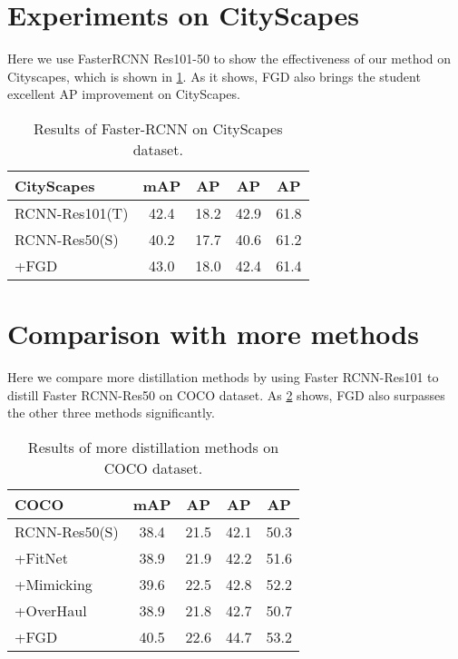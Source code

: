 \documentclass[10pt,twocolumn,letterpaper]{article}
\begin{document}
\section{Experiments on CityScapes}
Here we use FasterRCNN Res101-50 to show the effectiveness of our method on Cityscapes\cite{cordts2016cityscapes}, which is shown in \cref{table:city results}. As it shows, FGD also brings the student excellent AP improvement on CityScapes.
\begin{table}
  \centering
  \begin{tabular}{l|cccc}
    \toprule
    {\bf CityScapes} & mAP & AP & AP & AP\\
    \midrule
    RCNN-Res101(T) & 42.4 &18.2&42.9&61.8\\
    RCNN-Res50(S) & 40.2 &17.7&40.6&61.2\\
    +FGD & 43.0&18.0&42.4&61.4 \\
    \bottomrule
  \end{tabular}
\caption{Results of Faster-RCNN on CityScapes dataset.}
 \label{table:city results}
\end{table}

\section{Comparison with more methods}
Here we compare more distillation methods\cite{romero2014fitnets,li2017mimicking,heo2019comprehensive} by using Faster RCNN-Res101 to distill Faster RCNN-Res50 on COCO dataset. As \cref{table:more methods} shows, FGD also surpasses the other three methods significantly.

\begin{table}
  \centering
  \begin{tabular}{l|cccc}
    \toprule
    {\bf COCO} & mAP & AP & AP & AP\\
    \midrule
    RCNN-Res50(S) & 38.4 &21.5&42.1&50.3\\
    +FitNet\cite{romero2014fitnets} &38.9 &21.9&42.2&51.6\\
    +Mimicking\cite{li2017mimicking} &39.6 &22.5&42.8&52.2\\
    +OverHaul\cite{heo2019comprehensive} &38.9 &21.8&42.7&50.7\\
    +FGD & 40.5&22.6&44.7&53.2 \\
    \bottomrule
  \end{tabular}
\caption{Results of more distillation methods on COCO dataset.}
 \label{table:more methods}
\end{table}
\end{document}
